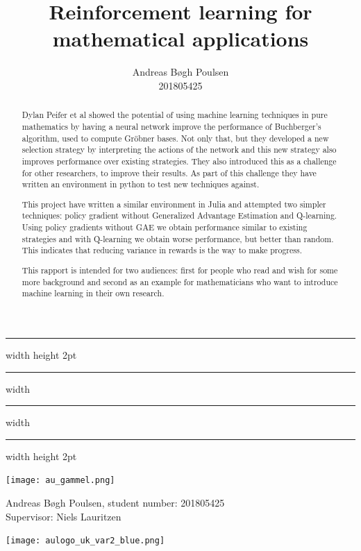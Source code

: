 \documentclass{article}
\title{Reinforcement learning for mathematical applications}
\author{
    Andreas Bøgh Poulsen\\
    201805425
}
\theoremstyle{changedot}
\theoremstyle{changedotbreak}
\theoremstyle{nonumberplain}
\begin{document}
\begin{titlepage}
  \center \sc
  \hrule width \hsize height 2pt \kern 1mm \hrule width \hsize
  \vspace{4mm}
  \vspace{6mm}
  \hrule width \hsize \kern 1mm \hrule width \hsize height 2pt
  \vspace{10mm}

  \vspace{10mm}

  \texttt{[image: au\_gammel.png]}

  \vspace{15mm}

  {\large Andreas Bøgh Poulsen, student number: 201805425 \\ Supervisor: Niels Lauritzen}

  \vspace{7mm}

  \texttt{[image: aulogo\_uk\_var2\_blue.png]}
\end{titlepage}

\begin{abstract}
  Dylan Peifer et al \cite{peifer} showed the potential of using machine learning techniques in pure mathematics by having a neural network improve the performance of Buchberger's algorithm, used to compute Gröbner bases. Not only that, but they developed a new selection strategy by interpreting the actions of the network and this new strategy also improves performance over existing strategies. They also introduced this as a challenge for other researchers, to improve their results. As part of this challenge they have written an environment in python to test new techniques against.

  This project have written a similar environment in Julia and attempted two simpler techniques: policy gradient without Generalized Advantage Estimation and Q-learning. Using policy gradients without GAE we obtain performance similar to existing strategies and with Q-learning we obtain worse performance, but better than random. This indicates that reducing variance in rewards is the way to make progress.

  This rapport is intended for two audiences: first for people who read \cite{peifer} and wish for some more background and second as an example for mathematicians who want to introduce machine learning in their own research.
\end{abstract}
\end{document}
